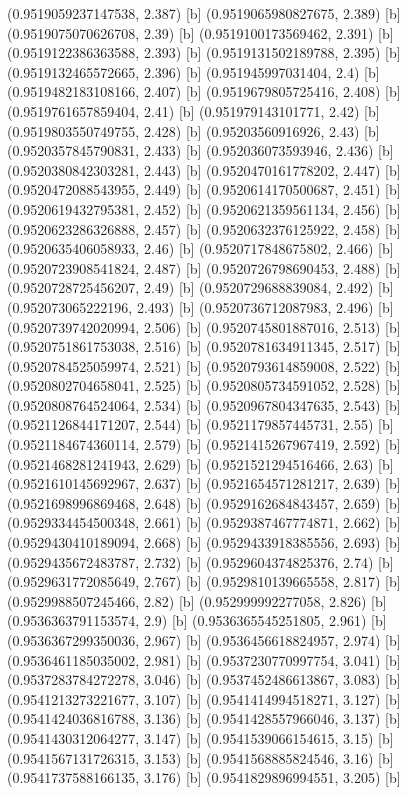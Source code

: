 {{{(0.9519059237147538, 2.387) [b] 
(0.9519065980827675, 2.389) [b] 
(0.9519075070626708, 2.39) [b] 
(0.9519100173569462, 2.391) [b] 
(0.9519122386363588, 2.393) [b] 
(0.9519131502189788, 2.395) [b] 
(0.9519132465572665, 2.396) [b] 
(0.951945997031404, 2.4) [b] 
(0.9519482183108166, 2.407) [b] 
(0.9519679805725416, 2.408) [b] 
(0.9519761657859404, 2.41) [b] 
(0.951979143101771, 2.42) [b] 
(0.9519803550749755, 2.428) [b] 
(0.95203560916926, 2.43) [b] 
(0.9520357845790831, 2.433) [b] 
(0.952036073593946, 2.436) [b] 
(0.9520380842303281, 2.443) [b] 
(0.9520470161778202, 2.447) [b] 
(0.9520472088543955, 2.449) [b] 
(0.9520614170500687, 2.451) [b] 
(0.9520619432795381, 2.452) [b] 
(0.9520621359561134, 2.456) [b] 
(0.9520623286326888, 2.457) [b] 
(0.9520632376125922, 2.458) [b] 
(0.9520635406058933, 2.46) [b] 
(0.9520717848675802, 2.466) [b] 
(0.9520723908541824, 2.487) [b] 
(0.9520726798690453, 2.488) [b] 
(0.9520728725456207, 2.49) [b] 
(0.9520729688839084, 2.492) [b] 
(0.952073065222196, 2.493) [b] 
(0.9520736712087983, 2.496) [b] 
(0.9520739742020994, 2.506) [b] 
(0.9520745801887016, 2.513) [b] 
(0.9520751861753038, 2.516) [b] 
(0.9520781634911345, 2.517) [b] 
(0.9520784525059974, 2.521) [b] 
(0.9520793614859008, 2.522) [b] 
(0.9520802704658041, 2.525) [b] 
(0.9520805734591052, 2.528) [b] 
(0.9520808764524064, 2.534) [b] 
(0.9520967804347635, 2.543) [b] 
(0.9521126844171207, 2.544) [b] 
(0.9521179857445731, 2.55) [b] 
(0.9521184674360114, 2.579) [b] 
(0.9521415267967419, 2.592) [b] 
(0.9521468281241943, 2.629) [b] 
(0.9521521294516466, 2.63) [b] 
(0.9521610145692967, 2.637) [b] 
(0.9521654571281217, 2.639) [b] 
(0.9521698996869468, 2.648) [b] 
(0.9529162684843457, 2.659) [b] 
(0.9529334454500348, 2.661) [b] 
(0.9529387467774871, 2.662) [b] 
(0.9529430410189094, 2.668) [b] 
(0.9529433918385556, 2.693) [b] 
(0.9529435672483787, 2.732) [b] 
(0.9529604374825376, 2.74) [b] 
(0.9529631772085649, 2.767) [b] 
(0.9529810139665558, 2.817) [b] 
(0.9529988507245466, 2.82) [b] 
(0.952999992277058, 2.826) [b] 
(0.9536363791153574, 2.9) [b] 
(0.9536365545251805, 2.961) [b] 
(0.9536367299350036, 2.967) [b] 
(0.9536456618824957, 2.974) [b] 
(0.9536461185035002, 2.981) [b] 
(0.9537230770997754, 3.041) [b] 
(0.9537283784272278, 3.046) [b] 
(0.9537452486613867, 3.083) [b] 
(0.9541213273221677, 3.107) [b] 
(0.9541414994518271, 3.127) [b] 
(0.9541424036816788, 3.136) [b] 
(0.9541428557966046, 3.137) [b] 
(0.9541430312064277, 3.147) [b] 
(0.9541539066154615, 3.15) [b] 
(0.9541567131726315, 3.153) [b] 
(0.9541568885824546, 3.16) [b] 
(0.9541737588166135, 3.176) [b] 
(0.9541829896994551, 3.205) [b] 
}}}
